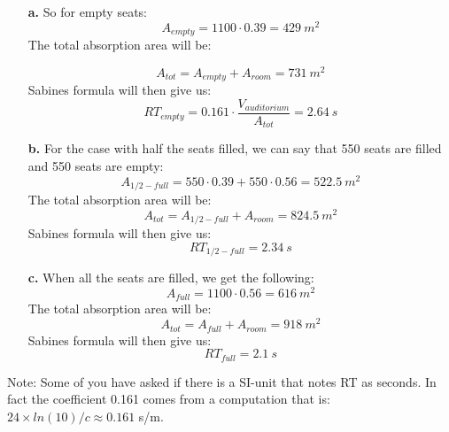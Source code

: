\documentclass{article}
\begin{document}
\begin{itemize}
    \item [\textbf{a.}] So for empty seats:
    \begin{equation}
        A_{empty}=1100 \cdot 0.39 = 429\ m^2
    \end{equation}
    The total absorption area will be:
    
    \begin{equation}
        A_{tot} = A_{empty}+A_{room} = 731 \ m^2
    \end{equation}
    Sabines formula will then give us:
    \begin{equation}
    RT_{empty} = 0.161 \cdot \frac{V_{auditorium}}{A_{tot}}= 2.64 \ s
    \end{equation}
    
    \item [\textbf{b.}] For the case with half the seats filled, we can say that 550 seats are filled and 550 seats are empty:
    \begin{equation}
        A_{1/2-full}=550 \cdot 0.39 + 550 \cdot 0.56 = 522.5\ m^2
    \end{equation}
    The total absorption area will be:
    \begin{equation}
        A_{tot} = A_{1/2-full}+A_{room} = 824.5 \ m^2
    \end{equation}
    Sabines formula will then give us:
    \begin{equation}
    RT_{1/2-full}= 2.34 \ s
    \end{equation}
    
    \item [\textbf{c.}] When all the seats are filled, we get the following:
    \begin{equation}
        A_{full}=1100 \cdot 0.56 = 616 \ m^2
    \end{equation}
    The total absorption area will be:
    \begin{equation}
        A_{tot} = A_{full}+A_{room} = 918 \ m^2
    \end{equation}
    Sabines formula will then give us:
    \begin{equation}
    RT_{full}= 2.1 \ s
    \end{equation}
\end{itemize}

Note: Some of you have asked if there is a SI-unit that notes RT as seconds. In fact the coefficient 0.161 comes from a computation that is: $24\times ln(10)/c \approx 0.161$ s/m.
\end{document}
